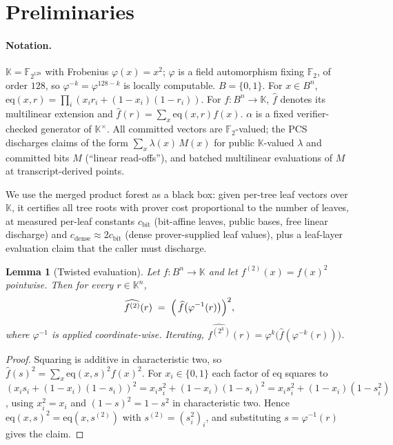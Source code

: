 \documentclass[11pt]{article}
\newtheorem{lemma}[theorem]{Lemma}
\theoremstyle{definition}
\newcommand{\K}{\mathbb{K}}
\newcommand{\F}{\mathbb{F}}
\newcommand{\eq}{\mathrm{eq}}
\newcommand{\mhat}[1]{\widehat{#1}}
\begin{document}
\section{Preliminaries}\label{sec:prelim}

\paragraph{Notation.}
$\K=\F_{2^{128}}$ with Frobenius $\varphi(x)=x^2$;
$\varphi$ is a field automorphism fixing $\F_2$, of order $128$, so
$\varphi^{-k}=\varphi^{128-k}$ is locally computable. $B=\{0,1\}$. For
$x\in B^n$, $\eq(x,r)=\prod_i (x_ir_i+(1-x_i)(1-r_i))$. For
$f:B^n\to\K$, $\mhat f$ denotes its multilinear extension and
$\mhat f(r)=\sum_x \eq(x,r)f(x)$. $\alpha$ is a fixed
verifier-checked generator of $\K^\times$. All committed vectors are
$\F_2$-valued; the PCS discharges claims of the form
$\sum_x \lambda(x)\,M(x)$ for public $\K$-valued $\lambda$ and committed
bits $M$ (``linear read-offs''), and batched multilinear evaluations of
$M$ at transcript-derived points.

We use the merged product forest as a black box: given per-tree leaf
vectors over $\K$, it certifies all tree roots with prover cost
proportional to the number of leaves, at measured per-leaf constants
$c_{\mathrm{bit}}$ (bit-affine leaves, public bases, free linear
discharge) and $c_{\mathrm{dense}}\approx 2c_{\mathrm{bit}}$ (dense
prover-supplied leaf values), plus a leaf-layer evaluation claim that the
caller must discharge.

\begin{lemma}[Twisted evaluation]\label{lem:twist}
Let $f:B^n\to\K$ and let $f^{(2)}(x)=f(x)^2$ pointwise. Then for every
$r\in\K^n$,
\[
\mhat{f^{(2)}}(r) \;=\; \Bigl(\, \mhat f\bigl(\varphi^{-1}(r)\bigr)
\Bigr)^2 ,
\]
where $\varphi^{-1}$ is applied coordinate-wise. Iterating,
$\mhat{f^{(2^k)}}(r)=\varphi^k\!\bigl(\mhat f(\varphi^{-k}(r))\bigr)$.
\end{lemma}
\begin{proof}
Squaring is additive in characteristic two, so
$\mhat f(s)^2=\sum_x \eq(x,s)^2 f(x)^2$. For $x_i\in\{0,1\}$ each factor
of $\eq$ squares to
$(x_is_i+(1-x_i)(1-s_i))^2 = x_is_i^2+(1-x_i)(1-s_i)^2
= x_is_i^2+(1-x_i)(1-s_i^2)$,
using $x_i^2=x_i$ and $(1-s)^2=1-s^2$ in characteristic two. Hence
$\eq(x,s)^2=\eq(x,s^{(2)})$ with $s^{(2)}=(s_i^2)_i$, and substituting
$s=\varphi^{-1}(r)$ gives the claim.
\end{proof}
\end{document}
